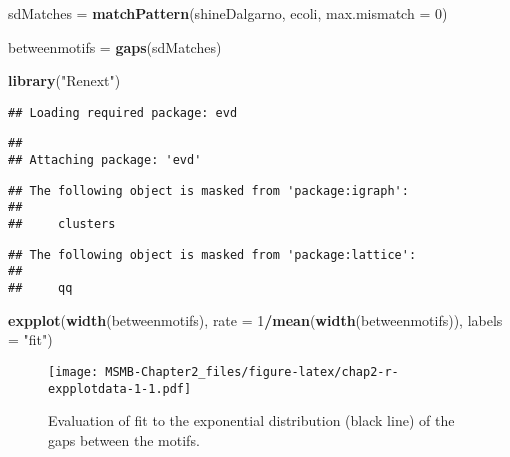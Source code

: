 \documentclass[]{article}
\newenvironment{Shaded}{\begin{snugshade}}{\end{snugshade}}
\newcommand{\KeywordTok}[1]{\textcolor[rgb]{0.13,0.29,0.53}{\textbf{#1}}}
\newcommand{\DataTypeTok}[1]{\textcolor[rgb]{0.13,0.29,0.53}{#1}}
\newcommand{\DecValTok}[1]{\textcolor[rgb]{0.00,0.00,0.81}{#1}}
\newcommand{\StringTok}[1]{\textcolor[rgb]{0.31,0.60,0.02}{#1}}
\newcommand{\OperatorTok}[1]{\textcolor[rgb]{0.81,0.36,0.00}{\textbf{#1}}}
\newcommand{\NormalTok}[1]{#1}
\begin{document}
\begin{Shaded}
\begin{Highlighting}[]
\NormalTok{sdMatches =}\StringTok{ }\KeywordTok{matchPattern}\NormalTok{(shineDalgarno, ecoli, }\DataTypeTok{max.mismatch =} \DecValTok{0}\NormalTok{)}
\end{Highlighting}
\end{Shaded}

\begin{Shaded}
\begin{Highlighting}[]
\NormalTok{betweenmotifs =}\StringTok{ }\KeywordTok{gaps}\NormalTok{(sdMatches)}
\end{Highlighting}
\end{Shaded}

\begin{Shaded}
\begin{Highlighting}[]
\KeywordTok{library}\NormalTok{(}\StringTok{"Renext"}\NormalTok{)}
\end{Highlighting}
\end{Shaded}

\begin{verbatim}
## Loading required package: evd
\end{verbatim}

\begin{verbatim}
## 
## Attaching package: 'evd'
\end{verbatim}

\begin{verbatim}
## The following object is masked from 'package:igraph':
## 
##     clusters
\end{verbatim}

\begin{verbatim}
## The following object is masked from 'package:lattice':
## 
##     qq
\end{verbatim}

\begin{Shaded}
\begin{Highlighting}[]
\KeywordTok{expplot}\NormalTok{(}\KeywordTok{width}\NormalTok{(betweenmotifs), }\DataTypeTok{rate =} \DecValTok{1}\OperatorTok{/}\KeywordTok{mean}\NormalTok{(}\KeywordTok{width}\NormalTok{(betweenmotifs)),}
        \DataTypeTok{labels =} \StringTok{"fit"}\NormalTok{)}
\end{Highlighting}
\end{Shaded}

\begin{figure}
\centering
\texttt{[image: MSMB-Chapter2\_files/figure-latex/chap2-r-expplotdata-1-1.pdf]}
\caption{Evaluation of fit to the exponential distribution (black line)
of the gaps between the motifs.}
\end{figure}
\end{document}
